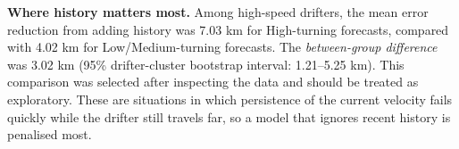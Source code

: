 \item \textbf{Where history matters most.} Among high-speed drifters, the mean error reduction from adding history was 7.03 km for High-turning forecasts, compared with 4.02 km for Low/Medium-turning forecasts. The \emph{between-group difference} was 3.02 km (95\% drifter-cluster bootstrap interval: 1.21--5.25 km). This comparison was selected after inspecting the data and should be treated as exploratory. These are situations in which persistence of the current velocity fails quickly while the drifter still travels far, so a model that ignores recent history is penalised most.
